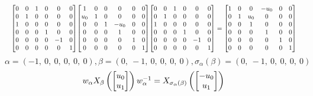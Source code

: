 \documentclass[11pt]{article}
\theoremstyle{definition}
\begin{document}
\[
\scaletoalign{\textwidth}{{\left[\begin{matrix}0 & 0 & 1 & 0 & 0 & 0\\0 & 1 & 0 & 0 & 0 & 0\\1 & 0 & 0 & 0 & 0 & 0\\0 & 0 & 0 & 1 & 0 & 0\\0 & 0 & 0 & 0 & -1 & 0\\0 & 0 & 0 & 0 & 0 & 1\end{matrix}\right]} {\left[\begin{matrix}1 & 0 & 0 & 0 & 0 & 0\\u_{0} & 1 & 0 & 0 & 0 & 0\\0 & 0 & 1 & - u_{0} & 0 & 0\\0 & 0 & 0 & 1 & 0 & 0\\0 & 0 & 0 & 0 & 1 & 0\\0 & 0 & 0 & 0 & 0 & 1\end{matrix}\right]} {\left[\begin{matrix}0 & 0 & 1 & 0 & 0 & 0\\0 & 1 & 0 & 0 & 0 & 0\\1 & 0 & 0 & 0 & 0 & 0\\0 & 0 & 0 & 1 & 0 & 0\\0 & 0 & 0 & 0 & -1 & 0\\0 & 0 & 0 & 0 & 0 & 1\end{matrix}\right]} = {\left[\begin{matrix}1 & 0 & 0 & - u_{0} & 0 & 0\\0 & 1 & u_{0} & 0 & 0 & 0\\0 & 0 & 1 & 0 & 0 & 0\\0 & 0 & 0 & 1 & 0 & 0\\0 & 0 & 0 & 0 & 1 & 0\\0 & 0 & 0 & 0 & 0 & 1\end{matrix}\right]}}
\]
\[
\alpha = \left( -1, \  0, \  0, \  0, \  0, \  0\right), \beta = \left( 0, \  -1, \  0, \  0, \  0, \  0\right), \sigma_{\alpha}(\beta) = \left( 0, \  -1, \  0, \  0, \  0, \  0\right)
\]
\[
\scaletoalign{\textwidth}{w_{\alpha} X_{\beta}\left(\left[\begin{matrix}u_{0}\\u_{1}\end{matrix}\right]\right) w_{\alpha}^{-1} = X_{\sigma_{\alpha}\left(\beta\right)}\left(\left[\begin{matrix}- u_{0}\\u_{1}\end{matrix}\right]\right)}
\]
\end{document}
